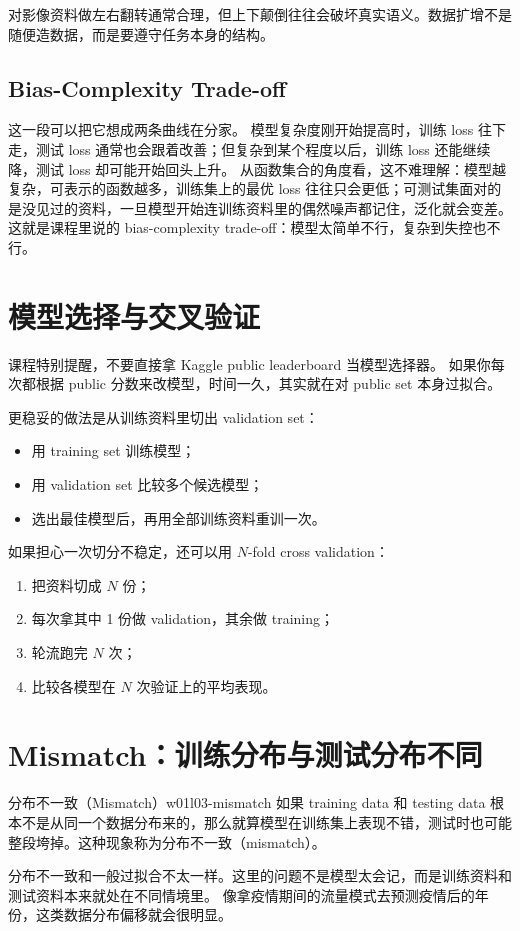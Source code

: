 \documentclass[main.tex]{subfiles}
\begin{document}
\begin{examplebox}
对影像资料做左右翻转通常合理，但上下颠倒往往会破坏真实语义。数据扩增不是随便造数据，而是要遵守任务本身的结构。
\end{examplebox}

\subsection{Bias-Complexity Trade-off}
\label{sec:w01l03-bias-complexity}

这一段可以把它想成两条曲线在分家。
模型复杂度刚开始提高时，训练 loss 往下走，测试 loss 通常也会跟着改善；但复杂到某个程度以后，训练 loss 还能继续降，测试 loss 却可能开始回头上升。
从函数集合的角度看，这不难理解：模型越复杂，可表示的函数越多，训练集上的最优 loss 往往只会更低；可测试集面对的是没见过的资料，一旦模型开始连训练资料里的偶然噪声都记住，泛化就会变差。
这就是课程里说的 bias-complexity trade-off：模型太简单不行，复杂到失控也不行。

\section{模型选择与交叉验证}
\label{sec:w01l03-model-selection}

课程特别提醒，不要直接拿 Kaggle public leaderboard 当模型选择器。
如果你每次都根据 public 分数来改模型，时间一久，其实就在对 public set 本身过拟合。

更稳妥的做法是从训练资料里切出 validation set：
\begin{itemize}
  \item 用 training set 训练模型；
  \item 用 validation set 比较多个候选模型；
  \item 选出最佳模型后，再用全部训练资料重训一次。
\end{itemize}

如果担心一次切分不稳定，还可以用 $N$-fold cross validation：
\begin{enumerate}
  \item 把资料切成 $N$ 份；
  \item 每次拿其中 1 份做 validation，其余做 training；
  \item 轮流跑完 $N$ 次；
  \item 比较各模型在 $N$ 次验证上的平均表现。
\end{enumerate}

\section{Mismatch：训练分布与测试分布不同}
\label{sec:w01l03-mismatch}

\begin{definition}{分布不一致（Mismatch）}{w01l03-mismatch}
如果 training data 和 testing data 根本不是从同一个数据分布来的，那么就算模型在训练集上表现不错，测试时也可能整段垮掉。这种现象称为分布不一致（mismatch）。
\end{definition}

分布不一致和一般过拟合不太一样。这里的问题不是模型太会记，而是训练资料和测试资料本来就处在不同情境里。
像拿疫情期间的流量模式去预测疫情后的年份，这类数据分布偏移就会很明显。
\end{document}
